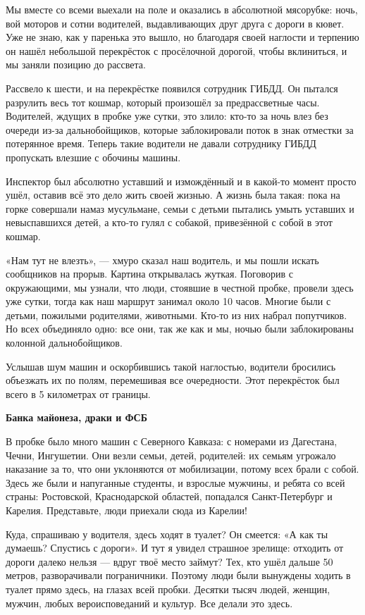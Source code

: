Мы вместе со всеми выехали на поле и оказались в абсолютной мясорубке: ночь, вой моторов и сотни водителей, выдавливающих друг друга с дороги в кювет. Уже не знаю, как у паренька это вышло, но благодаря своей наглости и терпению он нашёл небольшой перекрёсток с просёлочной дорогой, чтобы вклиниться, и мы заняли позицию до рассвета.


Рассвело к шести, и на перекрёстке появился сотрудник ГИБДД. Он пытался разрулить весь тот кошмар, который произошёл за предрассветные часы. Водителей, ждущих в пробке уже сутки, это злило: кто-то за ночь влез без очереди из-за дальнобойщиков, которые заблокировали поток в знак отместки за потерянное время. Теперь такие водители не давали сотруднику ГИБДД пропускать влезшие с обочины машины.

Инспектор был абсолютно уставший и измождённый и в какой-то момент просто ушёл, оставив всё это дело жить своей жизнью. А жизнь была такая: пока на горке совершали намаз мусульмане, семьи с детьми пытались умыть уставших и невыспавшихся детей, а кто-то гулял с собакой, привезённой с собой в этот кошмар.

«Нам тут не влезть», — хмуро сказал наш водитель, и мы пошли искать сообщников на прорыв. Картина открывалась жуткая. Поговорив с окружающими, мы узнали, что люди, стоявшие в честной пробке, провели здесь уже сутки, тогда как наш маршрут занимал около 10 часов. Многие были с детьми, пожилыми родителями, животными. Кто-то из них набрал попутчиков. Но всех объединяло одно: все они, так же как и мы, ночью были заблокированы колонной дальнобойщиков.

Услышав шум машин и оскорбившись такой наглостью, водители бросились объезжать их по полям, перемешивая все очередности. Этот перекрёсток был всего в 5 километрах от границы.


\textbf{Банка майонеза, драки и ФСБ}

В пробке было много машин с Северного Кавказа: с номерами из Дагестана, Чечни, Ингушетии. Они везли семьи, детей, родителей: их семьям угрожало наказание за то, что они уклоняются от мобилизации, потому всех брали с собой. Здесь же были и напуганные студенты, и взрослые мужчины, и ребята со всей страны: Ростовской, Краснодарской областей, попадался Санкт-Петербург и Карелия. Представьте, люди приехали сюда из Карелии!

Куда, спрашиваю у водителя, здесь ходят в туалет? Он смеется: «А как ты думаешь? Спустись с дороги». И тут я увидел страшное зрелище: отходить от дороги далеко нельзя — вдруг твоё место займут? Тех, кто ушёл дальше 50 метров, разворачивали пограничники. Поэтому люди были вынуждены ходить в туалет прямо здесь, на глазах всей пробки. Десятки тысяч людей, женщин, мужчин, любых вероисповеданий и культур. Все делали это здесь.

